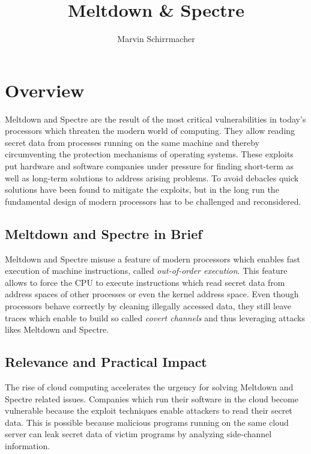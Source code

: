 \documentclass[a4paper,oneside,openright] {scrreprt}
\title{\Huge Meltdown \& Spectre}
\author{\Large Marvin Schirrmacher}
\begin{document}


\pagestyle{plain}
\cleardoublepage
{}
\tableofcontents
\clearpage
{}


\chapter{Overview}  
\label{ch:overview}

Meltdown and Spectre are the result of the most critical vulnerabilities in today's processors 
which threaten the modern world of computing. They allow reading secret data from processes running on
the same machine and thereby circumventing the protection mechanisms of operating systems.
These exploits put hardware and software companies under pressure for finding short-term as well
as long-term solutions to address arising problems. To avoid debacles quick solutions have been found 
to mitigate the exploits, but in the long run the fundamental design of modern 
processors has to be challenged and reconsidered.

\section{Meltdown and Spectre in Brief}
\label{ch:intro:motivation}

Meltdown and Spectre misuse a feature of modern processors which enables fast execution of machine instructions, 
called \textit{out-of-order execution}. This feature allows to force the CPU to execute instructions 
which read secret data from address spaces of other processes or even the kernel address space. 
Even though processors behave correctly by cleaning illegally accessed data, 
they still leave traces which enable to build so called \textit{covert channels} 
and thus leveraging attacks likes Meltdown and Spectre.

\section{Relevance and Practical Impact}
\label{ch:intro:motivation}

The rise of cloud computing accelerates the urgency for solving Meltdown and Spectre related issues.
Companies which run their software in the cloud become vulnerable because the exploit techniques enable attackers
to read their secret data. 
This is possible because malicious programs running on the same cloud server can leak secret data of victim programs
by analyzing side-channel information.   
\end{document}

